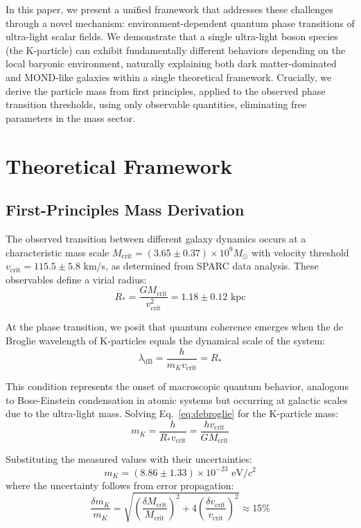 \documentclass[aps,prd,twocolumn,showpacs,superscriptaddress,groupedaddress,nofootinbib]{revtex4-2}
\begin{document}
In this paper, we present a unified framework that addresses these challenges through a novel mechanism: environment-dependent quantum phase transitions of ultra-light scalar fields. We demonstrate that a single ultra-light boson species (the K-particle) can exhibit fundamentally different behaviors depending on the local baryonic environment, naturally explaining both dark matter-dominated and MOND-like galaxies within a single theoretical framework. Crucially, we derive the particle mass from first principles, applied to the observed phase transition thresholds, using only observable quantities, eliminating free parameters in the mass sector.

\section{Theoretical Framework}

\subsection{First-Principles Mass Derivation}

The observed transition between different galaxy dynamics occurs at a characteristic mass scale $M_{\text{crit}} = (3.65 \pm 0.37) \times 10^9 M_{\odot}$ with velocity threshold $v_{\text{crit}} = 115.5 \pm 5.8$ km/s, as determined from SPARC data analysis. These observables define a virial radius:
\begin{equation}
R_* = \frac{GM_{\text{crit}}}{v_{\text{crit}}^2} = 1.18 \pm 0.12 \text{ kpc}
\end{equation}

At the phase transition, we posit that quantum coherence emerges when the de Broglie wavelength of K-particles equals the dynamical scale of the system:
\begin{equation}
\lambda_{\text{dB}} = \frac{h}{m_K v_{\text{crit}}} = R_*
\label{eq:debroglie}
\end{equation}

This condition represents the onset of macroscopic quantum behavior, analogous to Bose-Einstein condensation in atomic systems but occurring at galactic scales due to the ultra-light mass. Solving Eq.~\ref{eq:debroglie} for the K-particle mass:
\begin{equation}
m_K = \frac{h}{R_* v_{\text{crit}}} = \frac{h v_{\text{crit}}}{GM_{\text{crit}}}
\label{eq:mass}
\end{equation}

Substituting the measured values with their uncertainties:
\begin{equation}
m_K = (8.86 \pm 1.33) \times 10^{-23} \text{ eV}/c^2
\end{equation}
where the uncertainty follows from error propagation:
\begin{equation}
\frac{\delta m_K}{m_K} = \sqrt{\left(\frac{\delta M_{\text{crit}}}{M_{\text{crit}}}\right)^2 + 4\left(\frac{\delta v_{\text{crit}}}{v_{\text{crit}}}\right)^2} \approx 15\%
\end{equation}
\end{document}

